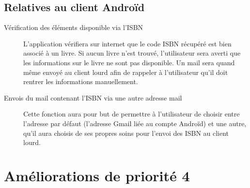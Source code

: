 \subsection{Relatives au client Androïd}
\begin{description}

\item[Vérification des éléments disponible via l'ISBN]
	L'application vérifiera sur internet que le code ISBN récupéré est bien associé à un livre.
	Si aucun livre n'est trouvé, l'utilisateur sera averti que les informations sur le livre ne sont pas disponible. 
	Un mail sera quand même envoyé au client lourd afin de rappeler à l'utilisateur qu'il doit rentrer les informations manuellement.
 
\item[Envois du mail contenant l'ISBN via une autre adresse mail]
	Cette fonction aura pour but de permettre à l'utilisateur de choisir entre l'adresse par défaut (l'adresse Gmail liée au compte Androïd) et une autre,
	qu'il aura choisis de ses propres soins pour l'envoi des ISBN au client lourd. 

\end{description}

\section{Améliorations de priorité 4}

